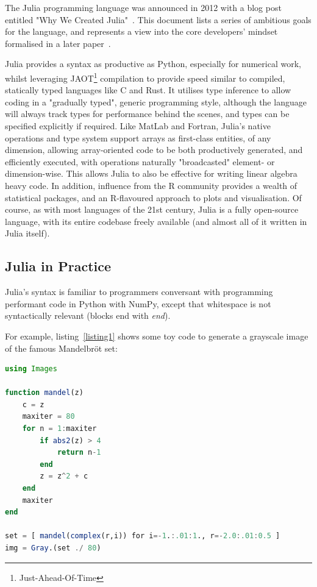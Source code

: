 \documentclass{webofc}
\begin{document}
The Julia programming language was announced in 2012 with a blog post entitled "Why We Created Julia"~\cite{why-create-julia}.
This document lists a series of ambitious goals for the language, and represents a view into the core developers' mindset formalised in a later paper~\cite{bib:julia_freshapproach,10.1145/3276490}.

Julia provides a syntax as productive as Python, especially for numerical work, whilst leveraging JAOT\footnote{Just-Ahead-Of-Time} compilation to provide speed similar to compiled, statically typed languages like C and Rust. 
It utilises type inference to allow coding in a "gradually typed", generic programming style, although the 
language will always track types for performance behind the scenes, and types can be specified explicitly if required. 
Like MatLab and Fortran, Julia's native operations and type system support arrays as first-class entities, of any dimension, allowing array-oriented code to be both
productively generated, and efficiently executed, with operations naturally "broadcasted" element- or dimension-wise. This allows Julia to also be 
effective for writing linear algebra heavy code. 
In addition, influence from the R community provides a wealth of statistical packages, and an R-flavoured approach to plots and visualisation.
Of course, as with most languages of the 21st century, Julia is a fully open-source language, with its entire codebase freely available (and almost all of it written in Julia itself).

\subsection{Julia in Practice}

Julia's syntax is familiar to programmers conversant with programming performant code in Python with NumPy, except that whitespace is not
syntactically relevant (blocks end with \textit{end}).

For example, listing~\ref{listing1} shows some toy code to generate a grayscale image of the famous Mandelbr\"{o}t set:
\begin{lstlisting}[language=Julia, caption={}, label=listing1]  
using Images

function mandel(z)
    c = z
    maxiter = 80
    for n = 1:maxiter
        if abs2(z) > 4
            return n-1
        end
        z = z^2 + c
    end
    maxiter
end

set = [ mandel(complex(r,i)) for i=-1.:.01:1., r=-2.0:.01:0.5 ]
img = Gray.(set ./ 80)
\end{lstlisting}
\end{document}
